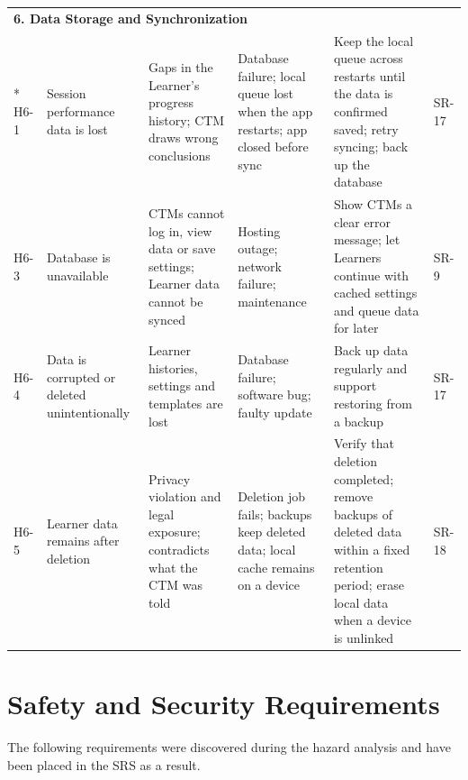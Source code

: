 \documentclass{article}
\begin{document}
\begin{landscape}
\begin{longtable}{p{1.0cm} p{3.1cm} p{3.9cm} p{3.9cm} p{5.2cm} p{2.5cm}}
\multicolumn{6}{l}{\textbf{6. Data Storage and Synchronization}}\\*
\midrule
H6-1 & Session performance data is lost &
Gaps in the Learner's progress history; CTM draws wrong conclusions &
Database failure; local queue lost when the app restarts; app closed before sync &
Keep the local queue across restarts until the data is confirmed saved; retry syncing; back up the database &
SR-17\\
\midrule
H6-3 & Database is unavailable &
CTMs cannot log in, view data or save settings; Learner data cannot be synced &
Hosting outage; network failure; maintenance &
Show CTMs a clear error message; let Learners continue with cached settings and queue data for later &
SR-9\\
\midrule
H6-4 & Data is corrupted or deleted unintentionally &
Learner histories, settings and templates are lost &
Database failure; software bug; faulty update &
Back up data regularly and support restoring from a backup &
SR-17\\
\midrule
H6-5 & Learner data remains after deletion &
Privacy violation and legal exposure; contradicts what the CTM was told &
Deletion job fails; backups keep deleted data; local cache remains on a device &
Verify that deletion completed; remove backups of deleted data within a fixed retention period; erase local data when a device is unlinked &
SR-18\\
\end{longtable}
\end{landscape}

\section{Safety and Security Requirements}

\label{sec:requirements}

The following requirements were discovered during the hazard analysis and have been placed in the SRS as a result.
\end{document}
